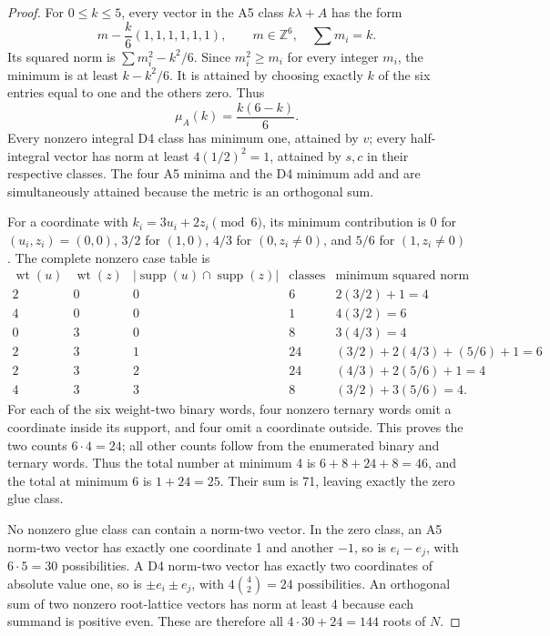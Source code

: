 \begin{proof}
For \(0\le k\le5\), every vector in the A5 class \(k\lambda+A\)
has the form
\[
 m-\frac{k}{6}(1,1,1,1,1,1),\qquad
 m\in\mathbb Z^6,\quad\sum m_i=k.
\]
Its squared norm is \(\sum m_i^2-k^2/6\).  Since
\(m_i^2\ge m_i\) for every integer \(m_i\), the minimum is at least
\(k-k^2/6\).  It is attained by choosing exactly \(k\) of the six
entries equal to one and the others zero.  Thus
\begin{equation}
 \mu_A(k)=\frac{k(6-k)}6.
 \label{esn:eq:a5-coset-minimum}
\end{equation}
Every nonzero integral D4 class has minimum one, attained by \(v\);
every half-integral vector has norm at least
\(4(1/2)^2=1\), attained by \(s,c\) in their respective classes.
The four A5 minima and the D4 minimum add and are simultaneously attained
because the metric is an orthogonal sum.

For a coordinate with \(k_i=3u_i+2z_i\pmod6\), its minimum
contribution is 0 for \((u_i,z_i)=(0,0)\), \(3/2\) for
\((1,0)\), \(4/3\) for \((0,z_i\ne0)\), and \(5/6\) for
\((1,z_i\ne0)\).  The complete nonzero case table is
\begin{equation}
\begin{array}{c|c|c|r|l}
 \operatorname{wt}(u)&\operatorname{wt}(z)&
 |\operatorname{supp}(u)\cap\operatorname{supp}(z)|&
 \text{classes}&\text{minimum squared norm}\\\hline
 2&0&0&6&2(3/2)+1=4\\
 4&0&0&1&4(3/2)=6\\
 0&3&0&8&3(4/3)=4\\
 2&3&1&24&(3/2)+2(4/3)+(5/6)+1=6\\
 2&3&2&24&(4/3)+2(5/6)+1=4\\
 4&3&3&8&(3/2)+3(5/6)=4.
\end{array}
 \label{esn:eq:glue-minimum-table}
\end{equation}
For each of the six weight-two binary words, four nonzero ternary
words omit a coordinate inside its support, and four omit a coordinate
outside.  This proves the two counts \(6\cdot4=24\); all other counts
follow from the enumerated binary and ternary words.  Thus the total
number at minimum 4 is \(6+8+24+8=46\), and the total at minimum 6 is
\(1+24=25\).  Their sum is 71, leaving exactly the zero glue class.

No nonzero glue class can contain a norm-two vector.  In the zero
class, an A5 norm-two vector has exactly one coordinate 1 and another
\(-1\), so is \(e_i-e_j\), with \(6\cdot5=30\) possibilities.
A D4 norm-two vector has exactly two coordinates of absolute value one,
so is \(\pm e_i\pm e_j\), with \(4\binom42=24\) possibilities.
An orthogonal sum of two nonzero root-lattice vectors has norm at least
4 because each summand is positive even.  These are therefore all
\(4\cdot30+24=144\) roots of \(N\).
\end{proof}

